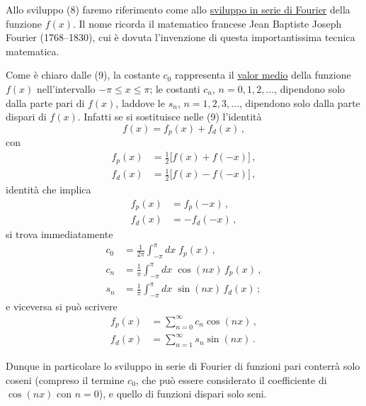 \documentclass[11pt, a4paper]{book}
\numberwithin{equation}{section}
\begin{document}
Allo sviluppo (8) faremo riferimento come allo \uline{sviluppo in serie di Fourier} della funzione $f(x)$. Il nome ricorda il matematico francese Jean Baptiste Joseph Fourier (1768--1830), cui è dovuta l'invenzione di questa importantissima tecnica matematica.

Come è chiaro dalle (9), la costante $c_0$ rappresenta il \uline{valor medio} della funzione $f(x)$ nell'intervallo $-\pi \leq x \leq \pi$; le costanti $c_n$, $n=0,1,2,\ldots$, dipendono solo dalla parte pari di $f(x)$, laddove le $s_n$, $n=1,2,3,\ldots$, dipendono solo dalla parte dispari di $f(x)$. Infatti se si sostituisce nelle (9) l'identità
\begin{equation}
  f(x) = f_p(x) + f_d(x)\,, \tag{10}
\end{equation}
con
\begin{align}
  f_p(x) &= \tfrac{1}{2}\bigl[f(x)+f(-x)\bigr]\,, \tag{11a}\\
  f_d(x) &= \tfrac{1}{2}\bigl[f(x)-f(-x)\bigr]\,, \tag{11b}
\end{align}
identità che implica
\begin{align}
  f_p(x) &= f_p(-x)\,, \tag{12a}\\
  f_d(x) &= -f_d(-x)\,, \tag{12b}
\end{align}
si trova immediatamente
\begin{align}
  c_0 &= \frac{1}{2\pi}\int_{-\pi}^{\pi} dx\;f_p(x)\,, \tag{13a}\\
  c_n &= \frac{1}{\pi}\int_{-\pi}^{\pi} dx\;\cos(nx)\,f_p(x)\,, \tag{13b}\\
  s_n &= \frac{1}{\pi}\int_{-\pi}^{\pi} dx\;\sin(nx)\,f_d(x)\,; \tag{13c}
\end{align}
e viceversa si può scrivere
\begin{align}
  f_p(x) &= \sum_{n=0}^{\infty} c_n\cos(nx)\,, \tag{14a}\\
  f_d(x) &= \sum_{n=1}^{\infty} s_n\sin(nx)\,. \tag{14b}
\end{align}

Dunque in particolare lo sviluppo in serie di Fourier di funzioni pari conterrà solo coseni (compreso il termine $c_0$, che può essere considerato il coefficiente di $\cos(nx)$ con $n=0$), e quello di funzioni dispari solo seni.
\end{document}
